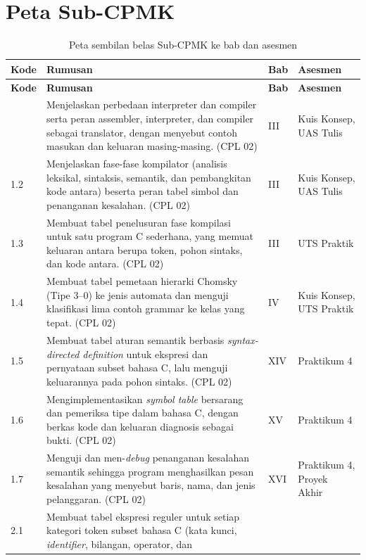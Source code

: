 \section*{Peta Sub-CPMK}

{\small
\begin{longtable}{@{}p{1.2cm}p{7.8cm}p{1.6cm}p{3.5cm}@{}}
\caption{Peta sembilan belas Sub-CPMK ke bab dan asesmen}
\label{tab:subcpmk}\\
\toprule
\textbf{Kode} & \textbf{Rumusan} & \textbf{Bab} & \textbf{Asesmen} \\
\midrule
\endfirsthead
\toprule
\textbf{Kode} & \textbf{Rumusan} & \textbf{Bab} & \textbf{Asesmen} \\
\midrule
\endhead
\bottomrule
\endfoot
1.1 & Menjelaskan perbedaan interpreter dan compiler serta peran
assembler, interpreter, dan compiler sebagai translator, dengan
menyebut contoh masukan dan keluaran masing-masing. (CPL 02) & III &
Kuis Konsep, UAS Tulis \\
1.2 & Menjelaskan fase-fase kompilator (analisis leksikal, sintaksis,
semantik, dan pembangkitan kode antara) beserta peran tabel simbol
dan penanganan kesalahan. (CPL 02) & III & Kuis Konsep, UAS Tulis \\
1.3 & Membuat tabel penelusuran fase kompilasi untuk satu program C
sederhana, yang memuat keluaran antara berupa token, pohon sintaks,
dan kode antara. (CPL 02) & III & UTS Praktik \\
1.4 & Membuat tabel pemetaan hierarki Chomsky (Tipe 3--0) ke jenis
automata dan menguji klasifikasi lima contoh grammar ke kelas yang
tepat. (CPL 02) & IV & Kuis Konsep, UTS Praktik \\
1.5 & Membuat tabel aturan semantik berbasis \textit{syntax-directed
definition} untuk ekspresi dan pernyataan subset bahasa C, lalu
menguji keluarannya pada pohon sintaks. (CPL 02) & XIV & Praktikum 4 \\
1.6 & Mengimplementasikan \textit{symbol table} bersarang dan pemeriksa
tipe dalam bahasa C, dengan berkas kode dan keluaran diagnosis sebagai
bukti. (CPL 02) & XV & Praktikum 4 \\
1.7 & Menguji dan men-\textit{debug} penanganan kesalahan semantik
sehingga program menghasilkan pesan kesalahan yang menyebut baris,
nama, dan jenis pelanggaran. (CPL 02) & XVI & Praktikum 4, Proyek
Akhir \\
2.1 & Membuat tabel ekspresi reguler untuk setiap kategori token subset
bahasa C (kata kunci, \textit{identifier}, bilangan, operator, dan

\end{longtable}}
